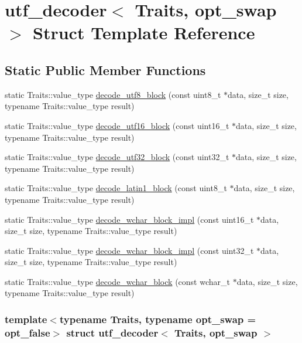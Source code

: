 \hypertarget{structutf__decoder}{
\section{utf\_\-decoder$<$ Traits, opt\_\-swap $>$ Struct Template Reference}
\label{structutf__decoder}
}
\subsection*{Static Public Member Functions}
\begin{CompactItemize}
\item 
static Traits::value\_\-type \hyperlink{structutf__decoder_671829bbdba1eac5c8bd2bf781eae498}{decode\_\-utf8\_\-block} (const uint8\_\-t $\ast$data, size\_\-t size, typename Traits::value\_\-type result)
\item 
static Traits::value\_\-type \hyperlink{structutf__decoder_c22afd983ac79318f0e7d07669bda8d1}{decode\_\-utf16\_\-block} (const uint16\_\-t $\ast$data, size\_\-t size, typename Traits::value\_\-type result)
\item 
static Traits::value\_\-type \hyperlink{structutf__decoder_8bed41cc707328e8d8ab91fd7c3c943e}{decode\_\-utf32\_\-block} (const uint32\_\-t $\ast$data, size\_\-t size, typename Traits::value\_\-type result)
\item 
static Traits::value\_\-type \hyperlink{structutf__decoder_3f728755fa7cc552e30e8d8776cad1ce}{decode\_\-latin1\_\-block} (const uint8\_\-t $\ast$data, size\_\-t size, typename Traits::value\_\-type result)
\item 
static Traits::value\_\-type \hyperlink{structutf__decoder_56b161067860fde1ed534ac3b7399e36}{decode\_\-wchar\_\-block\_\-impl} (const uint16\_\-t $\ast$data, size\_\-t size, typename Traits::value\_\-type result)
\item 
static Traits::value\_\-type \hyperlink{structutf__decoder_3bd423d3ce99b245c76be8a0796d951b}{decode\_\-wchar\_\-block\_\-impl} (const uint32\_\-t $\ast$data, size\_\-t size, typename Traits::value\_\-type result)
\item 
static Traits::value\_\-type \hyperlink{structutf__decoder_5953fd0661c64408e08161342e4c538d}{decode\_\-wchar\_\-block} (const wchar\_\-t $\ast$data, size\_\-t size, typename Traits::value\_\-type result)
\end{CompactItemize}
\subsubsection*{template$<$typename Traits, typename opt\_\-swap = opt\_\-false$>$ struct utf\_\-decoder$<$ Traits, opt\_\-swap $>$}



